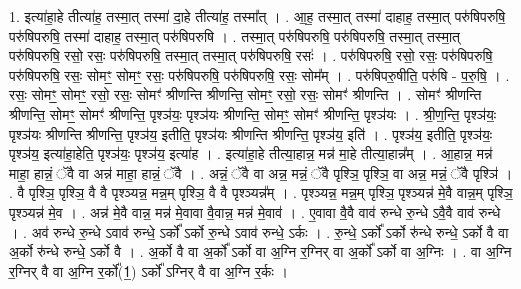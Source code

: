 \documentclass[17pt]{extarticle}
\begin{document}
1. इत्या॑हा॒हे तीत्या॑ह॒ तस्मा॒त् तस्मा॑ दा॒हे तीत्या॑ह॒ तस्मा᳚त् । . आ॒ह॒ तस्मा॒त् तस्मा॑ दाहाह॒ तस्मा॒त् परु॑षिपरुषि॒ परु॑षिपरुषि॒ तस्मा॑ दाहाह॒ तस्मा॒त् परु॑षिपरुषि । . तस्मा॒त् परु॑षिपरुषि॒ परु॑षिपरुषि॒ तस्मा॒त् तस्मा॒त् परु॑षिपरुषि॒ रसो॒ रसः॒ परु॑षिपरुषि॒ तस्मा॒त् तस्मा॒त् परु॑षिपरुषि॒ रसः॑ । . परु॑षिपरुषि॒ रसो॒ रसः॒ परु॑षिपरुषि॒ परु॑षिपरुषि॒ रसः॒ सोमꣳ॒॒ सोमꣳ॒॒ रसः॒ परु॑षिपरुषि॒ परु॑षिपरुषि॒ रसः॒ सोम᳚म् । . परु॑षिपरु॒षीति॒ परु॑षि - प॒रु॒षि॒ । . रसः॒ सोमꣳ॒॒ सोमꣳ॒॒ रसो॒ रसः॒ सोमꣳ॑ श्रीणन्ति श्रीणन्ति॒ सोमꣳ॒॒ रसो॒ रसः॒ सोमꣳ॑ श्रीणन्ति । . सोमꣳ॑ श्रीणन्ति श्रीणन्ति॒ सोमꣳ॒॒ सोमꣳ॑ श्रीणन्ति॒ पृश्ञ॑यः॒ पृश्ञ॑यः श्रीणन्ति॒ सोमꣳ॒॒ सोमꣳ॑ श्रीणन्ति॒ पृश्ञ॑यः । . श्री॒ण॒न्ति॒ पृश्ञ॑यः॒ पृश्ञ॑यः श्रीणन्ति श्रीणन्ति॒ पृश्ञ॑य॒ इतीति॒ पृश्ञ॑यः श्रीणन्ति श्रीणन्ति॒ पृश्ञ॑य॒ इति॑ । . पृश्ञ॑य॒ इतीति॒ पृश्ञ॑यः॒ पृश्ञ॑य॒ इत्या॑हा॒हेति॒ पृश्ञ॑यः॒ पृश्ञ॑य॒ इत्या॑ह । . इत्या॑हा॒हे तीत्या॒हान्न॒ मन्न॑ मा॒हे तीत्या॒हान्न᳚म् । . आ॒हान्न॒ मन्न॑ माहा॒ हान्नं॒ ॅवै वा अन्न॑ माहा॒ हान्नं॒ ॅवै । . अन्नं॒ ॅवै वा अन्न॒ मन्नं॒ ॅवै पृश्ञि॒ पृश्ञि॒ वा अन्न॒ मन्नं॒ ॅवै पृश्ञि॑ । . वै पृश्ञि॒ पृश्ञि॒ वै वै पृश्ञ्यन्न॒ मन्न॒म् पृश्ञि॒ वै वै पृश्ञ्यन्न᳚म् । . पृश्ञ्यन्न॒ मन्न॒म् पृश्ञि॒ पृश्ञ्यन्न॑ मे॒वै वान्न॒म् पृश्ञि॒ पृश्ञ्यन्न॑ मे॒व । . अन्न॑ मे॒वै वान्न॒ मन्न॑ मे॒वावा वै॒वान्न॒ मन्न॑ मे॒वाव॑ । . ए॒वावा वै॒वै वाव॑ रुन्धे रु॒न्धे ऽवै॒वै वाव॑ रुन्धे । . अव॑ रुन्धे रु॒न्धे ऽवाव॑ रुन्धे॒ ऽर्को᳚ ऽर्को रु॒न्धे ऽवाव॑ रुन्धे॒ ऽर्कः । . रु॒न्धे॒ ऽर्को᳚ ऽर्को रु॑न्धे रुन्धे॒ ऽर्को वै वा अ॒र्को रु॑न्धे रुन्धे॒ ऽर्को वै । . अ॒र्को वै वा अ॒र्को᳚ ऽर्को वा अ॒ग्नि र॒ग्निर् वा अ॒र्को᳚ ऽर्को वा अ॒ग्निः । . वा अ॒ग्नि र॒ग्निर् वै वा अ॒ग्नि र॒र्को᳚(1॒) ऽर्को᳚ ऽग्निर् वै वा अ॒ग्नि र॒र्कः । \newline
\end{document}
